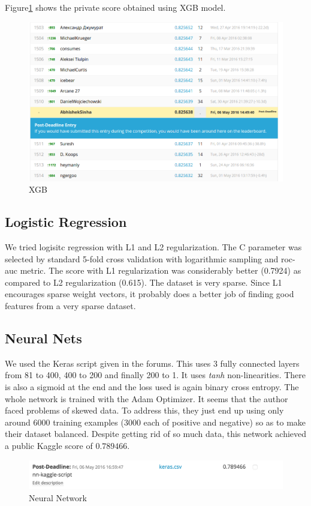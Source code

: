 \documentclass{article}
\begin{document}
Figure\ref{4a} shows the private score obtained using XGB model.
\begin{figure}[tbh]
\includegraphics[scale = 0.4]{xgb}
\caption{XGB}
\label{4a}
\end{figure}

\subsection{Logistic Regression}
We tried logisitc regression with L1 and L2 regularization. The C parameter was selected by standard 5-fold cross validation with logarithmic sampling and roc-auc metric. The score with L1 regularization was considerably better (0.7924) as compared to L2 regularization (0.615). The dataset is very sparse. Since L1 encourages sparse weight vectors, it probably does a better job of finding good features from a very sparse dataset.

\subsection{Neural Nets}
We used the Keras script given in the forums. This uses 3 fully connected layers from 81 to 400, 400 to 200 and finally 200 to 1. It uses \emph{tanh} non-linearities. There is also a sigmoid at the end and the loss used is again binary cross entropy.  The whole network is trained with the Adam Optimizer. It seems that the author faced problems of skewed data. To address this, they just end up using only around 6000 training examples (3000 each of positive and negative) so as to make their dataset balanced. Despite getting rid of so much data, this network achieved a public Kaggle score of $0.789466$.
\begin{figure}[tbh]
\includegraphics[scale = 0.7]{nn2}
\caption{Neural Network}
\end{figure}
\end{document}
